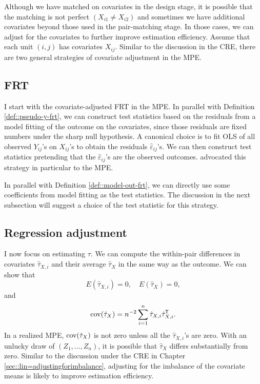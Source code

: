Although we have matched on covariates in the design stage, it is possible that the matching is not perfect $(X_{i1}\neq X_{i2})$ and sometimes we have additional covariates beyond those used in the pair-matching stage. In those cases, we can adjust for the covariates to further improve estimation efficiency. Assume that each unit $(i, j)$ has covariates $X_{ij} $. Similar to the discussion in the CRE, there are two general strategies of covariate adjustment in the MPE. 



\subsection{FRT}

 
I start with the covariate-adjusted FRT in the MPE. In parallel with Definition \ref{def::pseudo-y-frt},  we can construct test statistics based on the residuals from a model fitting of the outcome on the covariates, since those residuals are fixed numbers under the sharp null hypothesis. A canonical choice is to fit OLS of all observed $Y_{ij}$'s on $X_{ij}$'s to obtain the residuals $\hat \varepsilon_{ij}$'s. We can then construct test statistics pretending that the $\hat \varepsilon_{ij}$'s are the observed outcomes. \citet{rosenbaum2002covariance} advocated this strategy in particular to the MPE. 


In parallel with Definition \ref{def::model-out-frt}, we can directly use some coefficients from model fitting as the test statistics. The discussion in the next subsection will suggest a choice of the test statistic for this strategy. 



\subsection{Regression adjustment}


I now focus on estimating $\tau$. We can compute the within-pair differences in covariates $\hat{\tau}_{X,i} $ and their average $\hat{\tau}_X $ in the same way as the outcome. We can show that 
$$
 E(\hat{\tau}_{X,i}   ) = 0,\quad 
 E(\hat{\tau}_X ) = 0,
 $$
 and 
$$
\textup{cov}(\hat{\tau}_X   ) =n^{-2} \sum_{i=1}^n \hat{\tau}_{X,i}   \hat{\tau}_{X,i}  ^{\mkern-1.5mu\mathsf{T}} .
$$
 In a realized MPE, $\textup{cov}(\hat{\tau}_X   ) $ is not zero unless all the $\hat{\tau}_{X,i}  $'s are zero. With an unlucky draw of $(Z_1,\ldots, Z_n)$, it is possible that $\hat{\tau}_X $ differs substantially from zero. Similar to the discussion under the CRE in Chapter \ref{sec::lin=adjustingforimbalance}, adjusting for the imbalance of the covariate means is likely to improve estimation efficiency. 

